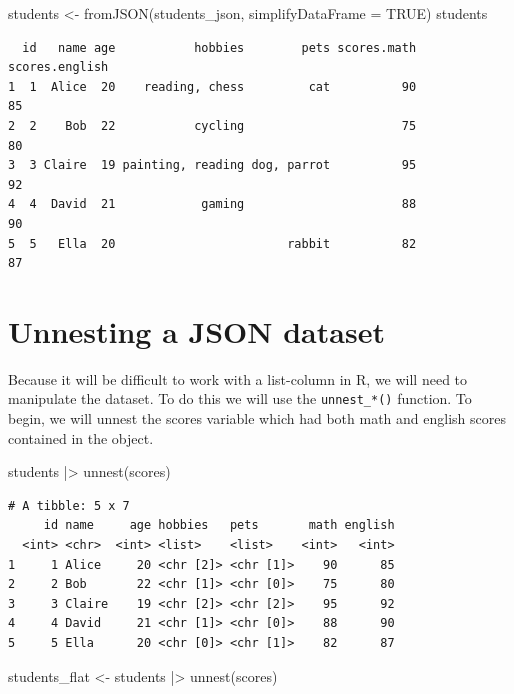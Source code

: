 \documentclass[
  letterpaper,
  DIV=11,
  numbers=noendperiod]{scrreprt}
\newenvironment{Shaded}{\begin{snugshade}}{\end{snugshade}}
\newcommand{\AttributeTok}[1]{\textcolor[rgb]{0.40,0.45,0.13}{#1}}
\newcommand{\ConstantTok}[1]{\textcolor[rgb]{0.56,0.35,0.01}{#1}}
\newcommand{\FunctionTok}[1]{\textcolor[rgb]{0.28,0.35,0.67}{#1}}
\newcommand{\NormalTok}[1]{\textcolor[rgb]{0.00,0.23,0.31}{#1}}
\newcommand{\OtherTok}[1]{\textcolor[rgb]{0.00,0.23,0.31}{#1}}
\newcommand{\SpecialCharTok}[1]{\textcolor[rgb]{0.37,0.37,0.37}{#1}}
\begin{document}
\begin{Shaded}
\begin{Highlighting}[]
\NormalTok{students }\OtherTok{\textless{}{-}} \FunctionTok{fromJSON}\NormalTok{(students\_json, }\AttributeTok{simplifyDataFrame =} \ConstantTok{TRUE}\NormalTok{)}
\NormalTok{students}
\end{Highlighting}
\end{Shaded}

\begin{verbatim}
  id   name age           hobbies        pets scores.math scores.english
1  1  Alice  20    reading, chess         cat          90             85
2  2    Bob  22           cycling                      75             80
3  3 Claire  19 painting, reading dog, parrot          95             92
4  4  David  21            gaming                      88             90
5  5   Ella  20                        rabbit          82             87
\end{verbatim}

\section{Unnesting a JSON dataset}\label{unnesting-a-json-dataset}

Because it will be difficult to work with a list-column in R, we will
need to manipulate the dataset. To do this we will use the
\texttt{unnest\_*()} function. To begin, we will unnest the scores
variable which had both math and english scores contained in the object.

\begin{Shaded}
\begin{Highlighting}[]
\NormalTok{students }\SpecialCharTok{|\textgreater{}} \FunctionTok{unnest}\NormalTok{(scores)}
\end{Highlighting}
\end{Shaded}

\begin{verbatim}
# A tibble: 5 x 7
     id name     age hobbies   pets       math english
  <int> <chr>  <int> <list>    <list>    <int>   <int>
1     1 Alice     20 <chr [2]> <chr [1]>    90      85
2     2 Bob       22 <chr [1]> <chr [0]>    75      80
3     3 Claire    19 <chr [2]> <chr [2]>    95      92
4     4 David     21 <chr [1]> <chr [0]>    88      90
5     5 Ella      20 <chr [0]> <chr [1]>    82      87
\end{verbatim}

\begin{Shaded}
\begin{Highlighting}[]
\NormalTok{students\_flat }\OtherTok{\textless{}{-}}\NormalTok{ students }\SpecialCharTok{|\textgreater{}} \FunctionTok{unnest}\NormalTok{(scores)}
\end{Highlighting}
\end{Shaded}
\end{document}

